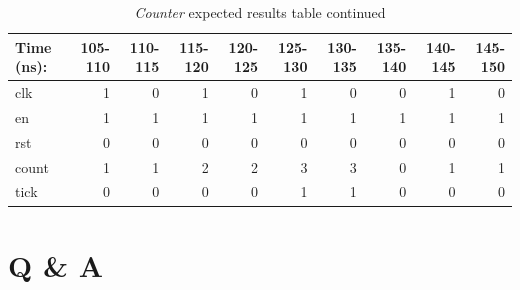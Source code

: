 \documentclass[11pt]{article}
\begin{document}
\begin{table}[ht]\centering
	\caption{\textit{Counter} expected results table continued}
	\label{ALU:tbl:register_ERT}\medskip
	\begin{tabular}{l|rrrrrrrrr}
		Time (ns): & 105-110 & 110-115 & 115-120 & 120-125 & 125-130 & 130-135 & 135-140 & 140-145 & 145-150\\
		\midrule
		clk & 1 & 0 & 1 & 0 & 1 & 0 & 0 & 1 & 0 \\
		en & 1 & 1 & 1 & 1 & 1 & 1 & 1 & 1 & 1 \\
		rst & 0 & 0 & 0 & 0 & 0 & 0 & 0 & 0 & 0 \\
		count & 1 & 1 & 2 & 2 & 3 & 3 & 0 & 1 & 1 \\
		tick & 0 & 0 & 0 & 0 & 1 & 1 & 0 & 0 & 0 \\
		\bottomrule
	\end{tabular}
\end{table}

\break

\section*{Q \& A}
\end{document}
